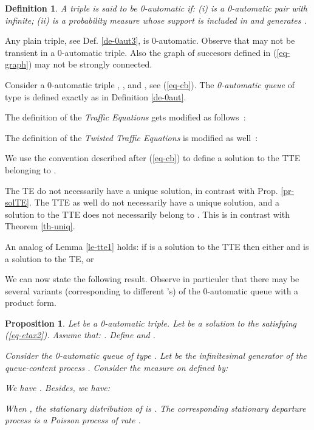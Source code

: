 \documentclass[11pt,a4paper]{article}
\newtheorem{proposition}[theorem]{Proposition}
\newtheorem{definition}[theorem]{Definition}
\theoremstyle{remark}
\def\eref#1{(\ref{#1})}
\begin{document}
\begin{definition}\label{de-0aut4}
A triple  is said to be {\em 0-automatic} if: (i)
 is a 0-automatic pair with  infinite; (ii)  is a
probability measure whose support is included in  and
generates .
\end{definition}

Any plain triple, see Def. \ref{de-0aut3}, is 0-automatic. 
Observe that  may not be transient in a 0-automatic
triple. Also the graph of succesors  defined in
\eref{eq-graph} may not be strongly connected. 

\medskip

Consider a 0-automatic triple ,  , and  , see \eref{eq-cb}. 
The {\em 0-automatic queue} of type  is
defined exactly as in Definition \ref{de-0aut}. 

The definition of the {\em Traffic Equations} gets modified as
follows~:

The definition of the {\em Twisted Traffic Equations} is modified as well~:



We use the convention described after
\eref{eq-cb} to define a solution to the TTE belonging to .

The TE do not necessarily have a unique solution, in
contrast with
Prop. \ref{pr-solTE}.
The TTE as well do not necessarily have a unique solution, and a 
solution  to the TTE does not necessarily belong to
. This is in contrast with Theorem \ref{th-uniq}. 

An analog of Lemma \ref{le-tte1} holds: if  is a
solution to the TTE then either  and  is a solution
to the TE, or


We can now state the following result. Observe in particuler that
there may be several variants (corresponding to different 's) of
the 0-automatic queue with a product form. 

\begin{proposition}\label{pr-bis}
Let  be a 0-automatic triple.
Let  be a solution to the
 satisfying \eref{eq-etax2}. Assume that: . Define
 and
.

Consider the 0-automatic queue of type
. Let  be the infinitesimal generator
of the queue-content process .
Consider the measure  on  defined by:

We have . Besides, we have:

When , the stationary distribution of
 is . The corresponding
stationary departure process is a Poisson process of rate .
\end{proposition}
\end{document}
